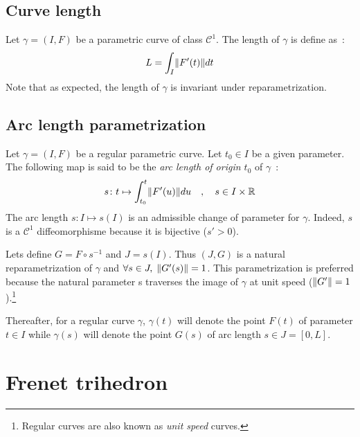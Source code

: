 \subsection{Curve length}
Let $\gamma=(I,F)$ be a parametric curve of class ${\mathcal{C}}^{1}$. The length of $\gamma$ is define as~:
\begin{equation}
	L=\int_{I}\lVert F'(t)\rVert dt
\end{equation}
Note that as expected, the length of $\gamma$ is invariant under reparametrization.

\subsection{Arc length parametrization}
Let $\gamma=(I,F)$ be a regular parametric curve. Let $t_0 \in I$ be a given parameter. The following map is said to be the \emph{arc length of origin $t_0$} of $\gamma$~:
\begin{equation}
	s \colon t \mapsto \int_{t_{0}}^{t}\lVert F'(u)\rVert du
	\quad,\quad
	s \in I \times \mathbb{R}
\end{equation}
The arc length $s \colon I\mapsto s(I)$ is an admissible change of parameter for $\gamma$. Indeed, $s$ is a ${\mathcal{C}}^{1}$ diffeomorphisme because it is bijective ($s'>0$).

Lets define $G=F\circ s^{-1}$ and $J=s(I)$. Thus $(J,G)$ is a natural reparametrization of $\gamma$ and  $\forall s \in J,\; \lVert G'(s)\rVert = 1$. This parametrization is preferred because the natural parameter s traverses the image of $\gamma$ at unit speed ($\lVert G'\rVert = 1$).\footnote{Regular curves are also known as \emph{unit speed} curves.}

Thereafter, for a regular curve $\gamma$, $\gamma(t)$ will denote the point $F(t)$ of parameter $t \in I$ while $\gamma(s)$ will denote the point $G(s)$ of arc length $s \in J=[0,L]$.


\section{Frenet trihedron}\label{sec:frenet_trihedron}


